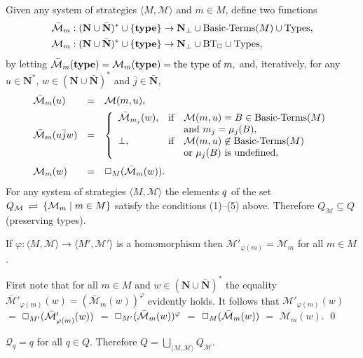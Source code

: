 \documentclass[fleqn]{LMCS}
\theoremstyle{plain}\newtheorem{satz}[thm]{Satz}
\theoremstyle{plain}\newtheorem{hyp}[thm]{Hypothesis}
\theoremstyle{plain}\newtheorem{hyps}[thm]{Hypotheses}
\theoremstyle{definition}\newtheorem{note}[thm]{Note}
\newcommand{\setof}[1]{\{#1\}}
\newcommand{\bYdef}{\mathrel{\BYDEF}}
\newcommand{\BYDEF}{\mbox{$\hspace{.2em}\rightleftharpoons\hspace{.2em}$}}
\newcommand{\arr}{\rightarrow}
\newcommand{\la}{\langle}
\newcommand{\ra}{\rangle}
\newcommand{\tuple}[1]{\la #1 \ra}
\newcommand{\NN}{\mathbf{N}}
\newcommand{\bNN}{\bar{\NN}}
\newcommand{\bMM}{\bar{\MM}}
\newcommand{\Undef}{{\perp}}
\newcommand{\MM}{{\mathcal M}}
\newcommand{\bj}{\bar{j}}
\newcommand{\QQ}{{\mathcal Q}}
\newcommand{\?}{\mbox{?}}
\begin{document}
Given any system of strategies $\tuple{M,\MM}$ and $m\in M$, define
two functions 
\begin{align*}
&\bMM_m:(\NN\cup\bNN)^*\cup\setof{\type}\arr 
                              \NN_\Undef\cup\textrm{Basic-Terms}(M)\cup\Types, \\
&\MM_m: (\NN\cup\bNN)^*\cup\setof{\type}\arr \NN_\Undef\cup\BT\cup\Types,
\end{align*} 
by letting 
$
\bMM_m(\type)=\MM_m(\type)=\textrm{the type of }m, 
$
and, iteratively, for any 
$u\in\NN^*$, $w\in(\NN\cup\bNN)^*$ and $\bj\in\bNN$,  
\begin{equation}\label{eq:bMM}
\begin{array}{lll}
\bMM_m(u)     &=&\MM(m,u), \\[0.5em]
\bMM_m(u\bj w)&=&\left\{
                      \begin{array}{lll}
                      \bMM_{m_j}(w), & \textrm{if} & \MM(m,u)=B\in\textrm{Basic-Terms}(M)\\
                                     &             &\textrm{and } m_j=\mu_j(B),\\
                      \Undef,  & \textrm{if} & \MM(m,u)\not\in\textrm{Basic-Terms}(M) \\
                      & & \textrm{or }\mu_j(B)\textrm{ is undefined},
                      \end{array}
                 \right. \\[2.5em]
\MM_m(w)      &=&\Erase_M(\bMM_m(w)).
\end{array}
\end{equation}
For any system of strategies $\tuple{M,\MM}$ the elements $q$ of the set $Q_\MM\bYdef\setof{\MM_m\mid m\in M}$ 
satisfy the conditions (1)--(5) above. Therefore $Q_\MM\subseteq Q$ 
(preserving types). 
\begin{lem}\label{lemma:hom-universal}
If $\varphi:\tuple{M,\MM}\arr\tuple{M',\MM'}$ is a homomorphism then 
$\MM'_{\varphi(m)}=\MM_m$ for all $m\in M$. 
\end{lem}
\proof
First note that for all $m\in M$ and $w\in(\NN\cup\bNN)^*$ the equality 
$
\bMM'_{\varphi(m)}(w)=(\bMM_m(w))^\varphi
$
evidently holds. 
It follows that 
$\MM'_{\varphi(m)}(w)$
$=$
$\Erase_{M'}(\bMM'_{\varphi(m)}(w))$
$=$
$\Erase_{M'}(\bMM_m(w))^\varphi$
$=$
$\Erase_{M}(\bMM_m(w))$
$=$
$\MM_m(w).$
\qed
\begin{lem}\label{lemma:universal}
$\QQ_q=q$ for all $q\in Q$. Therefore 
$Q=\bigcup_{\tuple{M,\MM}} Q_\MM$. 
\end{lem}
\end{document}
